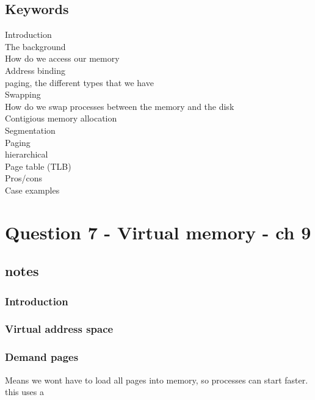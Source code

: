 \documentclass[a4paper,10pt,titlepage]{report}
\begin{document}
\subsection{Keywords}

Introduction\\
\hspace{10mm} The background\\
\hspace{15mm} How do we access our memory \\
\hspace{15mm} Address binding \\
\hspace{15mm} paging, the different types that we have \\
Swapping \\
\hspace{10mm} How do we swap processes between the memory and the disk \\
Contigious memory allocation \\
Segmentation \\
Paging \\
\hspace{10mm} hierarchical \\
Page table (TLB) \\
Pros/cons \\
Case examples \\






\section{Question 7 - Virtual memory - ch 9}
\subsection{notes}


\subsubsection{Introduction}

\subsubsection{Virtual address space}

\subsubsection{Demand pages}
Means we wont have to load all pages into memory, so processes can start faster. this uses a 
\end{document}
